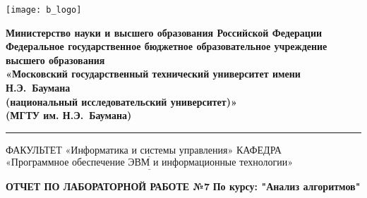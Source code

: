 


\noindent \begin{minipage}{0.15\textwidth}
	\texttt{[image: b\_logo]}
\end{minipage}
\noindent\begin{minipage}{0.9\textwidth}\centering
	\textbf{Министерство науки и высшего образования Российской Федерации}\\
	\textbf{Федеральное государственное бюджетное образовательное учреждение высшего образования}\\
	\textbf{«Московский государственный технический университет имени Н.Э.~Баумана}\\
	\textbf{(национальный исследовательский университет)»}\\
	\textbf{(МГТУ им. Н.Э.~Баумана)}
\end{minipage}

\noindent\rule{18cm}{3pt}
\newline
\noindent ФАКУЛЬТЕТ $\underline{\text{«Информатика и системы управления»}}$ \newline
\noindent КАФЕДРА $\underline{\text{«Программное обеспечение ЭВМ и информационные технологии»}}$\newline


\begin{center}
	\noindent\begin{minipage}{1.2\textwidth}\centering
		\textbf{ОТЧЕТ ПО ЛАБОРАТОРНОЙ РАБОТЕ №7}\newline
		\textbf{По курсу: "Анализ алгоритмов"}\newline\newline\newline
	\end{minipage}
\end{center}




